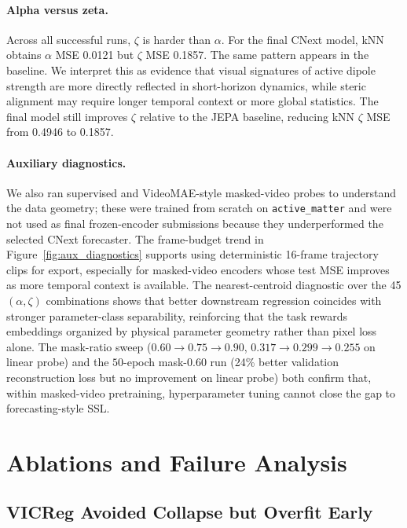 \documentclass{article}
\begin{document}
\paragraph{Alpha versus zeta.}
Across all successful runs, $\zeta$ is harder than $\alpha$. For the final CNext model, kNN obtains $\alpha$ MSE 0.0121 but $\zeta$ MSE 0.1857. The same pattern appears in the baseline. We interpret this as evidence that visual signatures of active dipole strength are more directly reflected in short-horizon dynamics, while steric alignment may require longer temporal context or more global statistics. The final model still improves $\zeta$ relative to the JEPA baseline, reducing kNN $\zeta$ MSE from 0.4946 to 0.1857.

\paragraph{Auxiliary diagnostics.}
We also ran supervised and VideoMAE-style masked-video probes to understand the data geometry; these were trained from scratch on \texttt{active\_matter} and were not used as final frozen-encoder submissions because they underperformed the selected CNext forecaster. The frame-budget trend in Figure~\ref{fig:aux_diagnostics} supports using deterministic 16-frame trajectory clips for export, especially for masked-video encoders whose test MSE improves as more temporal context is available. The nearest-centroid diagnostic over the 45 $(\alpha,\zeta)$ combinations shows that better downstream regression coincides with stronger parameter-class separability, reinforcing that the task rewards embeddings organized by physical parameter geometry rather than pixel loss alone. The mask-ratio sweep ($0.60\rightarrow0.75\rightarrow0.90$, $0.317\rightarrow0.299\rightarrow0.255$ on linear probe) and the $50$-epoch mask-$0.60$ run (24\% better validation reconstruction loss but no improvement on linear probe) both confirm that, within masked-video pretraining, hyperparameter tuning cannot close the gap to forecasting-style SSL.

\section{Ablations and Failure Analysis}

\subsection{VICReg Avoided Collapse but Overfit Early}
\end{document}
